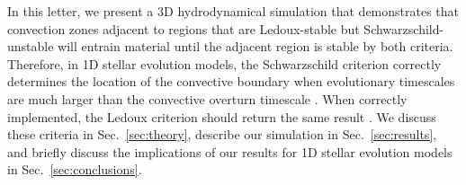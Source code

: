In this letter, we present a 3D hydrodynamical simulation that demonstrates that convection zones adjacent to regions that are Ledoux-stable but Schwarzschild-unstable will entrain material until the adjacent region is stable by both criteria.
Therefore, in 1D stellar evolution models, the Schwarzschild criterion correctly determines the location of the convective boundary when evolutionary timescales are much larger than the convective overturn timescale \citep[e.g., on the main sequence;][]{georgy_etal_2021}.
When correctly implemented, the Ledoux criterion should return the same result \citep{gabriel_etal_2014}.
We discuss these criteria in Sec.~\ref{sec:theory}, describe our simulation in Sec.~\ref{sec:results}, and briefly discuss the implications of our results for 1D stellar evolution models in Sec.~\ref{sec:conclusions}.
